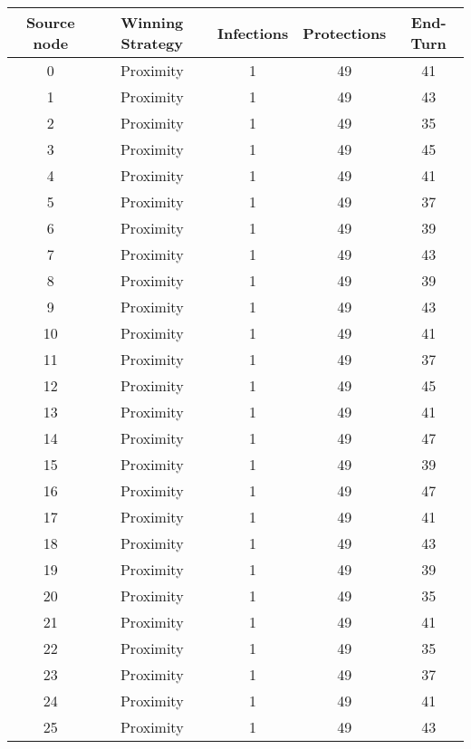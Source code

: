 \documentclass[results.tex]{subfiles}
\begin{document}
\begin{center}
  \begin{tabular}{| c || c | c | c | c |}
    \hline
    {\bfseries Source node} & {\bfseries Winning Strategy} & {\bfseries Infections} & {\bfseries Protections} & {\bfseries End-Turn} \\  %
    \hline\hline
    0 & Proximity & 1 & 49 & 41 \\ 
    \hline
    1 & Proximity & 1 & 49 & 43 \\ 
    \hline
    2 & Proximity & 1 & 49 & 35 \\ 
    \hline
    3 & Proximity & 1 & 49 & 45 \\ 
    \hline
    4 & Proximity & 1 & 49 & 41 \\ 
    \hline
    5 & Proximity & 1 & 49 & 37 \\ 
    \hline
    6 & Proximity & 1 & 49 & 39 \\ 
    \hline
    7 & Proximity & 1 & 49 & 43 \\ 
    \hline
    8 & Proximity & 1 & 49 & 39 \\ 
    \hline
    9 & Proximity & 1 & 49 & 43 \\ 
    \hline
    10 & Proximity & 1 & 49 & 41 \\ 
    \hline
    11 & Proximity & 1 & 49 & 37 \\ 
    \hline
    12 & Proximity & 1 & 49 & 45 \\ 
    \hline
    13 & Proximity & 1 & 49 & 41 \\ 
    \hline
    14 & Proximity & 1 & 49 & 47 \\ 
    \hline
    15 & Proximity & 1 & 49 & 39 \\ 
    \hline
    16 & Proximity & 1 & 49 & 47 \\ 
    \hline
    17 & Proximity & 1 & 49 & 41 \\ 
    \hline
    18 & Proximity & 1 & 49 & 43 \\ 
    \hline
    19 & Proximity & 1 & 49 & 39 \\ 
    \hline
    20 & Proximity & 1 & 49 & 35 \\ 
    \hline
    21 & Proximity & 1 & 49 & 41 \\ 
    \hline
    22 & Proximity & 1 & 49 & 35 \\ 
    \hline
    23 & Proximity & 1 & 49 & 37 \\ 
    \hline
    24 & Proximity & 1 & 49 & 41 \\ 
    \hline
    25 & Proximity & 1 & 49 & 43 \\ 

\end{tabular}
\end{center}
\end{document}
